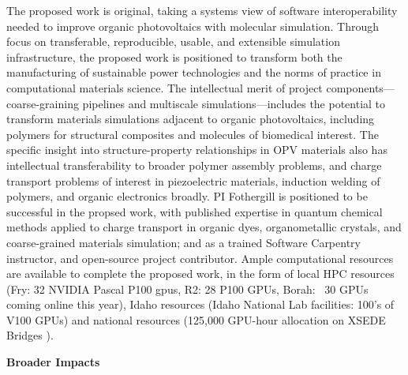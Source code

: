 The proposed work is original, taking a systems view of software interoperability needed to improve organic photovoltaics with molecular simulation.
Through focus on transferable, reproducible, usable, and extensible simulation infrastructure, the proposed work is positioned to transform both the manufacturing of sustainable power technologies and the norms of practice in computational materials science.
The intellectual merit of project components---coarse-graining pipelines and multiscale simulations---includes the potential to transform materials simulations adjacent to organic photovoltaics, including polymers for structural composites and molecules of biomedical interest.
The specific insight into structure-property relationships in OPV materials also has intellectual transferability to broader polymer assembly problems, and charge transport problems of interest in piezoelectric materials, induction welding of polymers, and organic electronics broadly.
PI Fothergill is positioned to be successful in the propsed work, with published expertise in quantum chemical methods applied to charge transport in organic dyes, organometallic crystals, and coarse-grained materials simulation; and as a trained Software Carpentry instructor, and open-source project contributor.
Ample computational resources are available to complete the proposed work, in the form of local HPC resources (Fry: 32 NVIDIA Pascal P100 gpus, R2: 28 P100 GPUs, Borah: ~30 GPUs coming online this year), Idaho resources (Idaho National Lab facilities: 100's of V100 GPUs) and national resources (125,000 GPU-hour allocation on XSEDE Bridges ).

\begin{center}
    \textbf{Broader Impacts}
\end{center}

